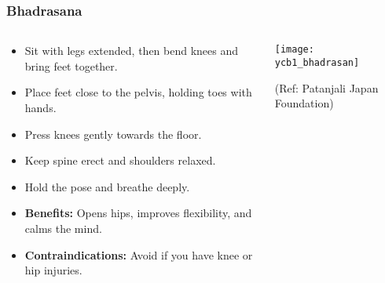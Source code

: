 \begin{frame}[fragile]\frametitle{Bhadrasana}
\begin{columns}
    \begin{column}[T]{0.5\linewidth}
      \begin{itemize}
        \item Sit with legs extended, then bend knees and bring feet together.
        \item Place feet close to the pelvis, holding toes with hands.
        \item Press knees gently towards the floor.
        \item Keep spine erect and shoulders relaxed.
        \item Hold the pose and breathe deeply.
        \item \textbf{Benefits:} Opens hips, improves flexibility, and calms the mind.
        \item \textbf{Contraindications:} Avoid if you have knee or hip injuries.
      \end{itemize}
    \end{column}
    \begin{column}[T]{0.5\linewidth}
        \begin{center}
        \begin{center}
		        \texttt{[image: ycb1\_bhadrasan]}
				
				{\tiny (Ref: Patanjali Japan Foundation)}	        
		\end{center}   
        \end{center}    
    \end{column}
  \end{columns}
\end{frame}

